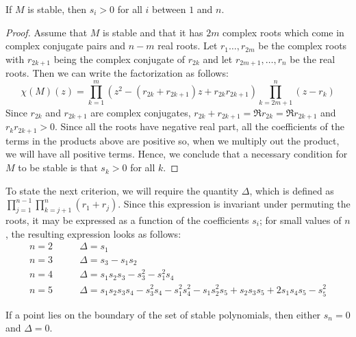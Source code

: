 \begin{lemma}
If $M$ is stable, then $s_i > 0$ for all $i$ between $1$ and $n$.
\end{lemma}

\begin{proof}
Assume that $M$ is stable and that it has $2m$ complex roots which come in
complex conjugate pairs and $n-m$ real roots.  Let $r_1 \ldots, r_{2m}$ be
the complex roots with $r_{2k+1}$ being the complex conjugate of $r_{2k}$
and let $r_{2m+1}, \ldots,  r_{n}$ be the real roots. Then we can write the
factorization as follows:
\[
\chi(M)(z) = \prod_{k=1}^{m} (z^2 - (r_{2k} + r_{2k+1}) z + r_{2k} r_{2k+1})
             \prod_{k=2m+1}^{n} (z - r_k)
\]
Since $r_{2k}$ and $r_{2k+1}$ are complex conjugates, $r_{2k} + r_{2k+1} =
\Re r_{2k} = \Re r_{2k+1}$ and $r_{k} r_{2k+1} > 0$.   Since all the
roots have negative real part, all the coefficients of the terms in
the products above are positive so, when we multiply out the product,
we will have all positive terms.  Hence, we conclude that a necessary
condition for $M$ to be stable is that $s_k > 0$ for all $k$.
\end{proof}

To state the next criterion, we will require the quantity $\Delta$, which
is defined as $\prod_{j=1}^{n-1} \prod_{k=j+1}^n (r_1 + r_j)$.  Since
this expression is invariant under permuting the roots, it may be expressed
as a function of the coefficients $s_i$; for small values of $n$, the
resulting expression looks as follows:
\begin{align*}
n=2 \qquad &\Delta = s_1 \\
n=3 \qquad &\Delta = s_3 - s_1 s_2 \\
n=4 \qquad &\Delta = s_1 s_2 s_3 - s_3^2 - s_1^2 s_4 \\
n=5 \qquad &\Delta = s_1 s_2 s_3 s_4 - s_3^2 s_4 - s_1^2 s_4^2 -
                     s_1 s_2^2 s_5 + s_2 s_3 s_5 + 2 s_1 s_4 s_5 - s_5^2
\end{align*}

\begin{lemma}
If a point lies on the boundary of the set of stable polynomials, then
either $s_n = 0$ and $\Delta = 0$.
\end{lemma}

